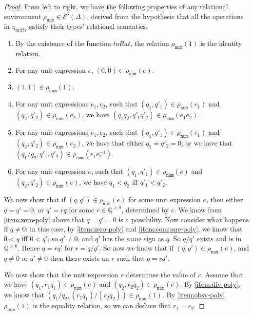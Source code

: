 \documentclass[natbib,preprint]{sigplanconf}
\newcommand{\tyPrimNm}[1]{\texttt{#1}}
\newcommand{\relEnv}[1]{\mathcal{#1}}
\begin{document}
\begin{proof}
  From left to right, we have the following properties of any
  relational environment $\rho_{\tyPrimNm{num}} \in
  \relEnv{E}'(\Delta)$, derived from the hypothesis that all the
  operations in $\eta_{\mathit{units}}$ satisfy their types'
  relational semantics.
  \begin{enumerate}
  \item\label{item:obsv-poly} By the existence of the function
    $\mathit{toRat}$, the relation $\rho_{\tyPrimNm{num}}(1)$ is the
    identity relation.
  \item\label{item:zero-poly} For any unit expression $e$, $(0,0) \in
    \rho_{\tyPrimNm{num}}(e)$.
  \item \label{item:one-poly} $(1,1) \in \rho_{\tyPrimNm{num}}(1)$.
  \item \label{item:mult-poly} For any unit expressions $e_1,e_2$,
    such that $(q_1,q'_1) \in \rho_{\tyPrimNm{num}}(e_1)$ and
    $(q_2,q'_2) \in \rho_{\tyPrimNm{num}}(e_2)$, we have $(q_1q_2,
    q'_1q'_2) \in \rho_{\tyPrimNm{num}}(e_1e_2)$.
  \item\label{item:div-poly} For any unit expressions $e_1,e_2$, such
    that $(q_1,q'_1) \in \rho_{\tyPrimNm{num}}(e_1)$ and $(q_2,q'_2)
    \in \rho_{\tyPrimNm{num}}(e_2)$, we have that either $q_2 = q'_2 =
    0$, or we have that $(q_1/q_2,q'_1,q'_2) \in
    \rho_{\tyPrimNm{num}}(e_1e_2^{-1})$.
  \item\label{item:compare-poly} For any unit expression $e$, such
    that $(q_1,q'_1) \in \rho_{\tyPrimNm{num}}(e)$ and $(q_2,q'_2) \in
    \rho_{\tyPrimNm{num}}(e)$, we have $q_1 < q_2$ iff $q'_1 < q'_2$.
  \end{enumerate}
  We now show that if $(q,q') \in \rho_{\tyPrimNm{num}}(e)$ for some
  unit expression $e$, then either $q = q' = 0$, or $q' = rq$ for some
  $r \in \mathbb{Q}^{>0}$, determined by $e$. We know from
  \ref{item:zero-poly} above that $q = q' = 0$ is a possibility. Now
  consider what happens if $q \not= 0$: in this case, by
  \ref{item:zero-poly} and \ref{item:compare-poly}, we know that $0 <
  q$ iff $0 < q'$, so $q' \not= 0$, and $q'$ has the same sign as
  $q$. So $q/q'$ exists and is in $\mathbb{Q}^{>0}$. Hence $q = rq'$
  for $r = q/q'$. So now we know that if $(q,q') \in
  \rho_{\tyPrimNm{num}}(e)$, and $q \not= 0$ or $q' \not= 0$ then
  there exists an $r$ such that $q = rq'$.

  We now show that the unit expression $e$ determines the value of
  $r$. Assume that we have $(q_1,r_1q_1) \in \rho_{\tyPrimNm{num}}(e)$
  and $(q_2,r_2q_2) \in \rho_{\tyPrimNm{num}}(e)$. By
  \ref{item:div-poly}, we know that $(q_1/q_2, (r_1q_1)/(r_2q_2)) \in
  \rho_{\tyPrimNm{num}}(1)$. By \ref{item:obsv-poly},
  $\rho_{\tyPrimNm{num}}(1)$ is the equality relation, so we can
  deduce that $r_1 = r_2$.


\end{proof}
\end{document}
